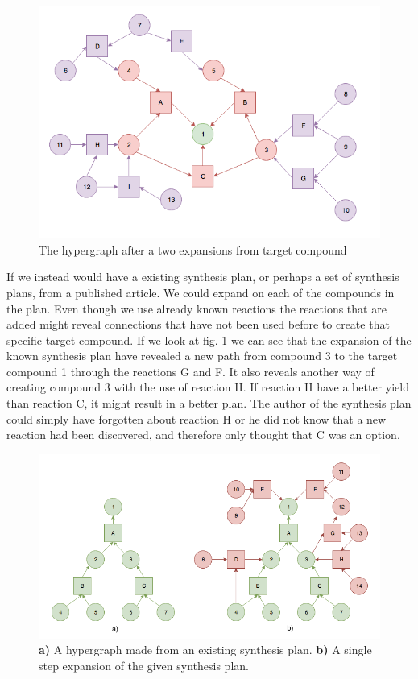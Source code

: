 \documentclass[a4paper,10pt,titlepage]{paper}
\begin{document}
\begin{figure}[H]
\centering
\includegraphics[scale=0.5]{Billeder/TestOfExpansion2.png}
\caption{The hypergraph after a two expansions from target compound}
\end{figure} 
If we instead would have a existing synthesis plan, or perhaps a set of synthesis plans, from a published article. We could expand on each of the compounds in the plan. Even though we use already known reactions the reactions that are added might reveal connections that have not been used before to create that specific target compound. If we look at fig. \ref{fig::ExpansionOfPath} we can see that the expansion of the known synthesis plan have revealed a new path from compound 3 to the target compound 1 through the reactions G and F. It also reveals another way of creating compound 3 with the use of reaction H. If reaction H have a better yield than reaction C, it might result in a better plan. The author of the synthesis plan could simply have forgotten about reaction H or he did not know that a new reaction had been discovered, and therefore only thought that C was an option. 
\begin{figure}[H]
\centering
\includegraphics[scale=0.5]{Billeder/ExpansionOfPath.png}
\caption{\textbf{a)} A hypergraph made from an existing synthesis plan. \textbf{b)} A single step expansion of the given synthesis plan.}
\label{fig::ExpansionOfPath}
\end{figure}
\end{document}
